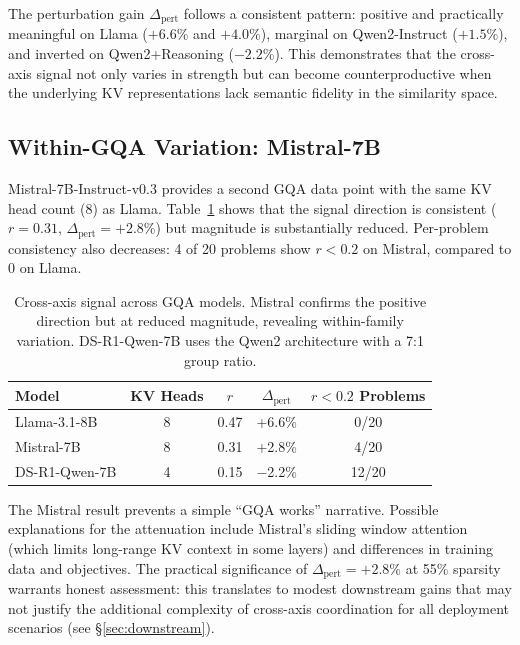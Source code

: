 \documentclass[11pt,a4paper]{article}
\begin{document}
The perturbation gain $\Delta_\text{pert}$ follows a consistent pattern: positive and practically meaningful on Llama ($+6.6\%$ and $+4.0\%$), marginal on Qwen2-Instruct ($+1.5\%$), and inverted on Qwen2+Reasoning ($-2.2\%$).
This demonstrates that the cross-axis signal not only varies in strength but can become counterproductive when the underlying KV representations lack semantic fidelity in the similarity space.

\subsection{Within-GQA Variation: Mistral-7B}

Mistral-7B-Instruct-v0.3 provides a second GQA data point with the same KV head count (8) as Llama.
Table~\ref{tab:gqa_comparison} shows that the signal direction is consistent ($r{=}0.31$, $\Delta_\text{pert}{=}{+}2.8\%$) but magnitude is substantially reduced.
Per-problem consistency also decreases: 4 of 20 problems show $r{<}0.2$ on Mistral, compared to 0 on Llama.

\begin{table}[t]
\centering
\small
\begin{tabular}{lcccc}
\toprule
\textbf{Model} & \textbf{KV Heads} & \textbf{$r$} & \textbf{$\Delta_\text{pert}$} & \textbf{$r{<}0.2$ Problems} \\
\midrule
Llama-3.1-8B   & 8 & 0.47 & +6.6\% & 0/20 \\
Mistral-7B     & 8 & 0.31 & +2.8\% & 4/20 \\
DS-R1-Qwen-7B  & 4 & 0.15 & $-$2.2\% & 12/20 \\
\bottomrule
\end{tabular}
\caption{Cross-axis signal across GQA models. Mistral confirms the positive direction but at reduced magnitude, revealing within-family variation. DS-R1-Qwen-7B uses the Qwen2 architecture with a 7:1 group ratio.}
\label{tab:gqa_comparison}
\end{table}

The Mistral result prevents a simple ``GQA works'' narrative.
Possible explanations for the attenuation include Mistral's sliding window attention (which limits long-range KV context in some layers) and differences in training data and objectives.
The practical significance of $\Delta_\text{pert}{=}{+}2.8\%$ at 55\% sparsity warrants honest assessment: this translates to modest downstream gains that may not justify the additional complexity of cross-axis coordination for all deployment scenarios (see \S\ref{sec:downstream}).
\end{document}
